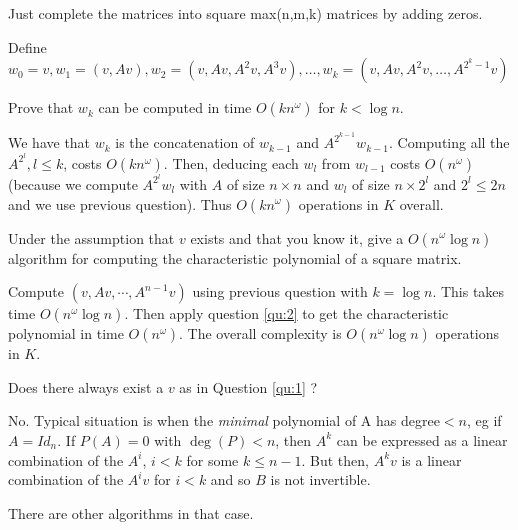 \documentclass[11pt]{exam}
\theoremstyle{definition}
\begin{document}
{\begin{questions}
	\begin{solution}
		Just complete the matrices into square max(n,m,k) matrices by adding zeros.
	\end{solution}
	
	\question Define $w_0 = v, w_1 = (v, Av), w_2 = (v, Av, A^2v, A^3v), \ldots, 
	w_k = (v, Av, A^2v, \ldots, A^{2^k - 1} v)$
	
	Prove that $w_k$ can be computed in time $O(k n^{\omega})$ for $k<\log n$.
	
	\begin{solution}
		We have that $w_k$ is the concatenation of $w_{k-1}$ and $A^{2^{k-1}} w_{k-1}$.
		Computing all the $A^{2^l}, l \leq k$, costs $O(k n^\omega)$.
		Then, deducing each $w_l$ from $w_{l-1}$ costs $O(n^\omega)$ (because we compute $A^{2^l} w_l$ with $A$ of size $n \times n$ and $w_l$ of size $n \times 2^l$ and $2^l \leq 2n$ and we use previous question).
		Thus $O(k n^\omega)$ operations in $K$ overall.
	\end{solution}
	
	\question Under the assumption that $v$ exists and that you know it, give a $O(n^\omega \log n)$ algorithm for computing the characteristic polynomial of a square matrix.
	
	\begin{solution}
		Compute $(v, Av, \cdots, A^{n-1}v)$ using previous question with $k = \log n$. This takes time $O(n^\omega \log n)$. Then apply question \ref{qu:2} to get the characteristic polynomial in time $O(n^\omega)$.
		The overall complexity is $O(n^\omega \log n)$ operations in $K$.
	\end{solution}
	
	
	\question Does there always exist a $v$ as in Question \ref{qu:1} ?
	
	\begin{solution}
		No. Typical situation is when the {\em minimal} polynomial of A has degree$ < n$,
		eg if $A = Id_n$. 
		If $P(A) = 0$ with $\deg(P) < n$, then $A^{k}$ can be expressed as a linear combination of the $A^i$, $i < k$ for some $k \leq n-1$. But then, $A^kv$ is a linear combination of the $A^iv$ for $i < k$ and so $B$ is not invertible.
		
		There are other algorithms in that case.
	\end{solution}
	
\end{questions}


}
\end{document}
